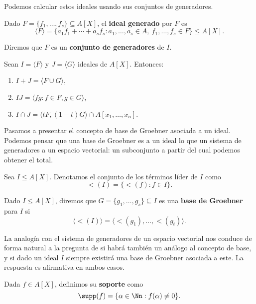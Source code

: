 Podemos calcular estos ideales usando sus conjuntos de generadores.
\begin{definicion}
    Dado $F=\{f_1,\dots, f_s\}\subseteq A[X]$, el \textbf{ideal generado} por $F$ es
    \begin{equation*}
        \langle F \rangle = \{a_1f_1 + \cdots + a_sf_s : a_1,\dots, a_s\in A,\ f_1,\dots, f_s\in F\}\le A[X].
    \end{equation*}

    Diremos que $F$ es un \textbf{conjunto de generadores} de $I$.
\end{definicion}

\begin{proposicion}
    Sean $I=\langle F\rangle$ y $J=\langle G\rangle$ ideales de $A[X]$. Entonces:
    \begin{enumerate}
        \item $I+J = \langle F\cup G\rangle$,
        \item $IJ = \langle fg : f\in F, g\in G \rangle$,
        \item $I\cap J = \langle tF, (1-t)G \rangle \cap A[x_1,\dots, x_n]$.
    \end{enumerate}
\end{proposicion}

Pasamos a presentar el concepto de base de Groebner asociada a un ideal. Podemos pensar que una base de Groebner es a un ideal lo que un sistema de generadores a un espacio vectorial: un subconjunto a partir del cual podemos obtener el total.
\begin{definicion}
    Sea $I\le A[X]$. Denotamos el conjunto de los términos líder de $I$ como
    \begin{equation*}
        \lt(I) = \{\lt(f) : f\in I\}.
    \end{equation*}
\end{definicion}

\begin{definicion}
    Dado $I\le A[X]$, diremos que $G = \{g_1,\dots, g_s\}\subseteq I$ es una \textbf{base de Groebner} para $I$ si 
    $$\langle \lt(I)\rangle = \langle \lt(g_1),\dots, \lt(g_t) \rangle.$$
\end{definicion}

La analogía con el sistema de generadores de un espacio vectorial nos conduce de forma natural a la pregunta de si habrá también un análogo al concepto de base, y si dado un ideal $I$ siempre existirá una base de Groebner asociada a este. La respuesta es afirmativa en ambos casos.
\begin{definicion}
    Dada $f\in A[X]$, definimos su \textbf{soporte} como $$\supp(f) = \{ \alpha\in\Nn : f(\alpha) \neq 0\}.$$
\end{definicion}

